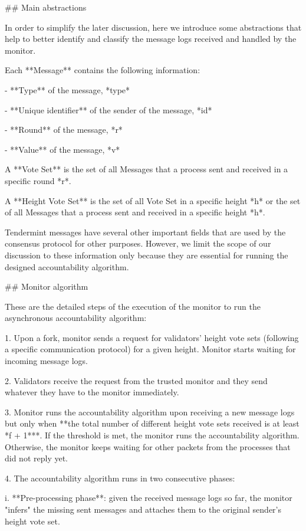 \documentclass[a4paper,11pt,oneside]{report}
\begin{document}
\begin{markdown}

## Main abstractions

In order to simplify the later discussion, here we introduce some abstractions that help to better identify and classify the message logs received and handled by the monitor.

Each **Message** contains the following information:

- **Type** of the message, *type*

- **Unique identifier** of the sender of the message, *id*

- **Round** of the message, *r*

- **Value** of the message, *v*

A **Vote Set** is the set of all Messages that a process sent and received in a specific round *r*.

A **Height Vote Set** is the set of all Vote Set in a specific height *h* or the set of all Messages that a process sent and received in a specific height *h*.

Tendermint messages have several other important fields that are used by the consensus protocol for other purposes. However, we limit the scope of our discussion to these information only because they are essential for running the designed accountability algorithm.       

## Monitor algorithm
 
These are the detailed steps of the execution of the monitor to run the asynchronous accountability algorithm: 
 
1. Upon a fork, monitor sends a request for validators' height vote sets (following a specific communication protocol) for a given height. Monitor starts waiting for incoming message logs.

2. Validators receive the request from the trusted monitor and they send whatever they have to the monitor immediately. 

3. Monitor runs the accountability algorithm upon receiving a new message logs but only when **the total number of different height vote sets received is at least *f + 1***. 
If the threshold is met, the monitor runs the accountability algorithm. Otherwise, the monitor keeps waiting for other packets from the processes that did not reply yet. 
      
4. The accountability algorithm runs in two consecutive phases:

    i. **Pre-processing phase**: given the received message logs so far, the monitor "infers" the missing sent messages and attaches them to the original sender's height vote set.


\end{markdown}
\end{document}
